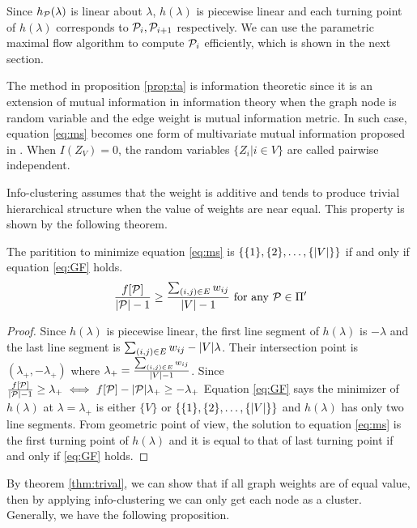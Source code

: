 \documentclass{article}
\begin{document}
Since $h_{\P}(\lambda)$ is linear about $\lambda$, $h(\lambda)$ is piecewise linear and each turning point of $h(\lambda)$ corresponds to $\P_i, \P_{i+1}$ respectively. We can use the parametric maximal flow algorithm to compute $\P_i$ efficiently, which is shown in the next section.

The method in proposition \ref{prop:ta} is information theoretic since it is an extension of mutual information in information theory when the graph node is random variable and the edge weight is mutual information metric. In such case, equation \eqref{eq:ms} becomes one form of multivariate mutual information proposed in \cite{RN1}. When $I(Z_V)=0$, the random variables $\{Z_i | i \in V\}$ are called pairwise independent. 

Info-clustering assumes that the weight is additive and tends to produce trivial hierarchical structure when the value of weights are near equal. This property is shown by the following theorem.
\begin{theorem}\label{thm:trival}
The paritition to minimize equation \eqref{eq:ms} is $\{\{1\},\{2\},\dots,\{\abs{V}\}\}$ if and only if equation \eqref{eq:GF} holds.
\begin{equation}\label{eq:GF}
\frac{f[\P]}{\abs{\P}-1} \geq \frac{\sum_{(i,j) \in E} w_{ij}}{\abs{V}-1} \textrm{ for any } \P \in \Pi'
\end{equation}
\end{theorem}
\begin{proof}
Since $h(\lambda)$ is piecewise linear, the first line segment of $h(\lambda)$ is $ - \lambda $ and the last line segment is $ \sum_{(i,j) \in E} w_{ij}- \abs{V} \lambda$. Their intersection point is $(\lambda_{+}, -\lambda_{+})$ where $\lambda_{+} = \frac{\sum_{(i,j) \in E} w_{ij}}{\abs{V}-1}$. Since $\frac{f[\P]}{\abs{\P}-1} \geq \lambda_{+} \iff f[\P] - \abs{\P}\lambda_{+} \geq - \lambda_{+}$ Equation \eqref{eq:GF} says the minimizer of $h(\lambda)$ at $\lambda = \lambda_{+}$ is either $\{V\}$ or $\{\{1\},\{2\},\dots,\{\abs{V}\}\}$ and $h(\lambda)$ has only two line segments. From geometric point of view, the solution to equation \eqref{eq:ms} is the first turning point of $h(\lambda)$ and it is equal to that of last turning point if and only if \eqref{eq:GF} holds.
\end{proof}
By theorem \ref{thm:trival}, we can show that if all graph weights are of equal value, then by applying info-clustering we can only get each node as a cluster. Generally, we have the following proposition.

\end{document}
